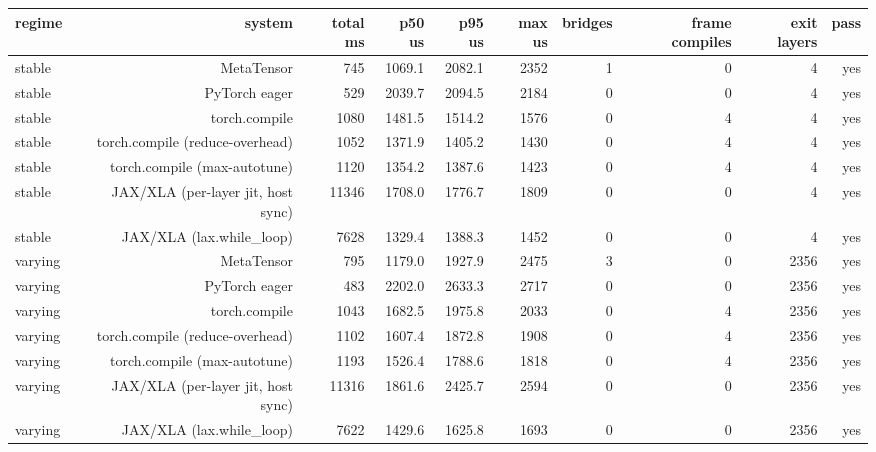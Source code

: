 \begin{tabular}{lrrrrrrrrr}
\toprule
regime & system & total ms & p50 us & p95 us & max us & bridges & frame compiles & exit layers & pass \\
\midrule
stable & MetaTensor & 745 & 1069.1 & 2082.1 & 2352 & 1 & 0 & 4 & yes \\
stable & PyTorch eager & 529 & 2039.7 & 2094.5 & 2184 & 0 & 0 & 4 & yes \\
stable & torch.compile & 1080 & 1481.5 & 1514.2 & 1576 & 0 & 4 & 4 & yes \\
stable & torch.compile (reduce-overhead) & 1052 & 1371.9 & 1405.2 & 1430 & 0 & 4 & 4 & yes \\
stable & torch.compile (max-autotune) & 1120 & 1354.2 & 1387.6 & 1423 & 0 & 4 & 4 & yes \\
stable & JAX/XLA (per-layer jit, host sync) & 11346 & 1708.0 & 1776.7 & 1809 & 0 & 0 & 4 & yes \\
stable & JAX/XLA (lax.while\_loop) & 7628 & 1329.4 & 1388.3 & 1452 & 0 & 0 & 4 & yes \\
varying & MetaTensor & 795 & 1179.0 & 1927.9 & 2475 & 3 & 0 & 2356 & yes \\
varying & PyTorch eager & 483 & 2202.0 & 2633.3 & 2717 & 0 & 0 & 2356 & yes \\
varying & torch.compile & 1043 & 1682.5 & 1975.8 & 2033 & 0 & 4 & 2356 & yes \\
varying & torch.compile (reduce-overhead) & 1102 & 1607.4 & 1872.8 & 1908 & 0 & 4 & 2356 & yes \\
varying & torch.compile (max-autotune) & 1193 & 1526.4 & 1788.6 & 1818 & 0 & 4 & 2356 & yes \\
varying & JAX/XLA (per-layer jit, host sync) & 11316 & 1861.6 & 2425.7 & 2594 & 0 & 0 & 2356 & yes \\
varying & JAX/XLA (lax.while\_loop) & 7622 & 1429.6 & 1625.8 & 1693 & 0 & 0 & 2356 & yes \\
\bottomrule
\end{tabular}
